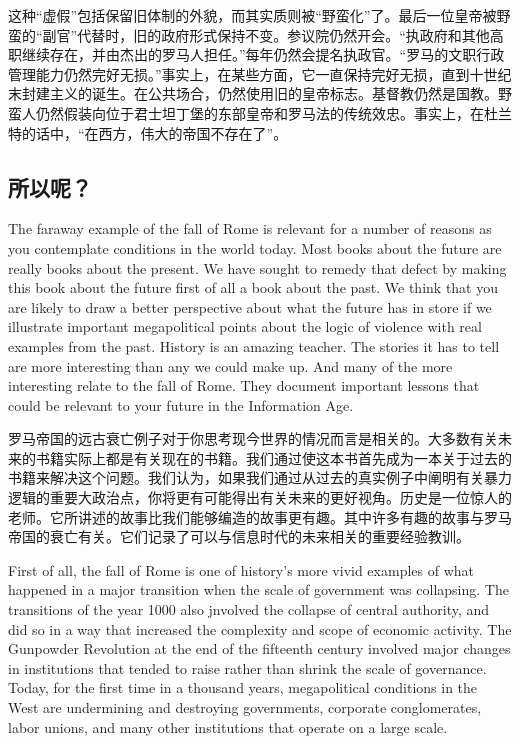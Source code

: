 \begin{Parallel}{97mm}{72mm}
  \ParallelRText
  {这种“虚假”包括保留旧体制的外貌，而其实质则被“野蛮化”了。最后一位皇帝被野蛮的“副官”代替时，旧的政府形式保持不变。参议院仍然开会。“执政府和其他高职继续存在，并由杰出的罗马人担任。”每年仍然会提名执政官。“罗马的文职行政管理能力仍然完好无损。”事实上，在某些方面，它一直保持完好无损，直到十世纪末封建主义的诞生。在公共场合，仍然使用旧的皇帝标志。基督教仍然是国教。野蛮人仍然假装向位于君士坦丁堡的东部皇帝和罗马法的传统效忠。事实上，在杜兰特的话中，“在西方，伟大的帝国不存在了”。}
  \ParallelPar

  \subsection{所以呢？}

  \ParallelLText
  {The faraway example of the fall of Rome is relevant for a number of reasons as you contemplate conditions in the world today. Most books about the future are really books about the present. We have sought to remedy that defect by making this book about the future first of all a book about the past. We think that you are likely to draw a better perspective about what the future has in store if we illustrate important megapolitical points about the logic of violence with real examples from the past. History is an amazing teacher. The stories it has to tell are more interesting than any we could make up. And many of the more interesting relate to the fall of Rome. They document important lessons that could be relevant to your future in the Information Age.}
  
  \ParallelRText
  {罗马帝国的远古衰亡例子对于你思考现今世界的情况而言是相关的。大多数有关未来的书籍实际上都是有关现在的书籍。我们通过使这本书首先成为一本关于过去的书籍来解决这个问题。我们认为，如果我们通过从过去的真实例子中阐明有关暴力逻辑的重要大政治点，你将更有可能得出有关未来的更好视角。历史是一位惊人的老师。它所讲述的故事比我们能够编造的故事更有趣。其中许多有趣的故事与罗马帝国的衰亡有关。它们记录了可以与信息时代的未来相关的重要经验教训。}
  \ParallelPar



  \ParallelLText
  {First of all, the fall of Rome is one of history's more vivid examples of what happened in a major transition when the scale of government was collapsing. The transitions of the year 1000 also jnvolved the collapse of central authority, and did so in a way that increased the complexity and scope of economic activity. The Gunpowder Revolution at the end of the fifteenth century involved major changes in institutions that tended to raise rather than shrink the scale of governance. Today, for the first time in a thousand years, megapolitical conditions in the West are undermining and destroying governments, corporate conglomerates, labor unions, and many other institutions that operate on a large scale.}
  

\end{Parallel}
